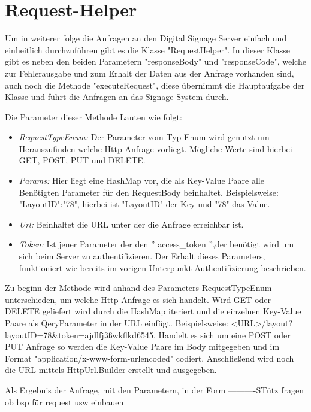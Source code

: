 \section{Request-Helper}
Um in weiterer folge die Anfragen an den Digital Signage Server einfach und einheitlich durchzuführen gibt es die Klasse "RequestHelper". In dieser Klasse gibt es neben den beiden Parametern "responseBody" und "responseCode", welche zur Fehlerausgabe und zum Erhalt der Daten aus der Anfrage vorhanden sind, auch noch die Methode "executeRequest", diese übernimmt die Hauptaufgabe der Klasse und führt die Anfragen an das Signage System durch.

Die Parameter dieser Methode Lauten wie folgt:

\begin{itemize}
	\item {\em RequestTypeEnum:} Der Parameter vom Typ Enum wird genutzt um Herauszufinden welche Http Anfrage vorliegt. Mögliche Werte sind hierbei GET, POST, PUT und DELETE.
	
	\item {\em Params:} Hier liegt eine HashMap vor, die als Key-Value Paare alle Benötigten Parameter für den RequestBody beinhaltet. Beispielsweise: "LayoutID":"78", hierbei ist "LayoutID" der Key und "78" das Value.
		
	\item {\em Url:} Beinhaltet die URL unter der die Anfrage erreichbar ist. 
	
	\item {\em Token:} Ist jener Parameter der den '' access\_token '',der benötigt wird um sich beim Server zu authentifizieren. Der Erhalt dieses Parameters, funktioniert wie bereits im vorigen Unterpunkt Authentifizierung beschrieben.
	
\end{itemize}

Zu beginn der Methode wird anhand des Parameters RequestTypeEnum unterschieden, um welche Http Anfrage es sich handelt. Wird GET oder DELETE geliefert wird durch die HashMap iteriert und die einzelnen Key-Value Paare als QeryParameter in der URL einfügt. Beispielsweise: <URL>/layout?layoutID=78&token=ajdlfjßßwkflkd6545.
Handelt es sich um eine POST oder PUT Anfrage so werden die Key-Value Paare im Body mitgegeben und im Format "application/x-www-form-urlencoded" codiert. Anschließend wird noch die URL mittels HttpUrl.Builder erstellt und ausgegeben. 




Als Ergebnis der Anfrage, mit den Parametern, in der Form
----------STütz fragen ob bsp für request usw einbauen



